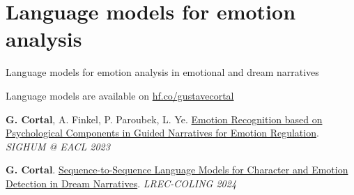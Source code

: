 \documentclass[handout,10pt]{beamer}
\begin{document}
\section{Language models for emotion analysis}

\begin{frame}{}
\Large
\vfill
\begin{center}
    Language models for emotion analysis in emotional and dream narratives
\end{center}

\vfill

\footnotesize




Language models are available on \href{https://huggingface.co/gustavecortal}{hf.co/gustavecortal}

\vspace{0.5cm}

\textbf{G. Cortal}, A. Finkel, P. Paroubek, L. Ye. \href{https://aclanthology.org/2023.latechclfl-1.8/}{Emotion Recognition based on Psychological Components in Guided Narratives for Emotion Regulation}. \textit{SIGHUM @ EACL 2023}

\vspace{0.5cm}

\textbf{G. Cortal}. \href{https://aclanthology.org/2024.lrec-main.1282/}{Sequence-to-Sequence Language Models for Character and Emotion Detection in Dream Narratives}. \textit{LREC-COLING 2024}

\end{frame}
\end{document}
